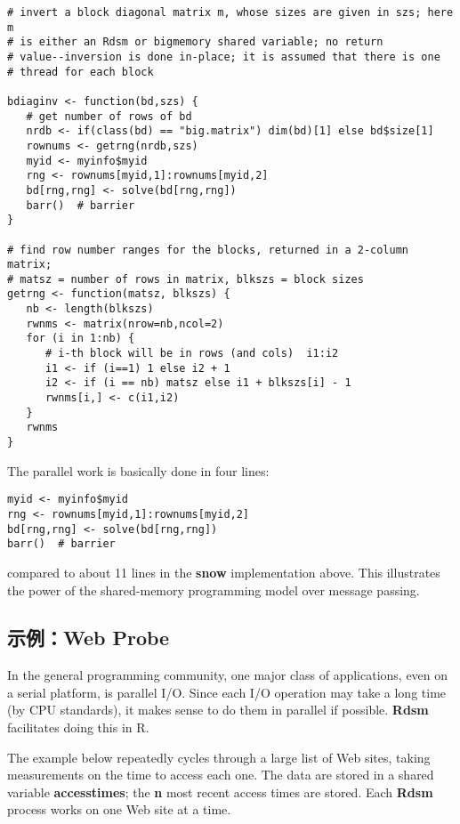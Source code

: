 \begin{lstlisting}
# invert a block diagonal matrix m, whose sizes are given in szs; here m
# is either an Rdsm or bigmemory shared variable; no return
# value--inversion is done in-place; it is assumed that there is one
# thread for each block

bdiaginv <- function(bd,szs) {
   # get number of rows of bd
   nrdb <- if(class(bd) == "big.matrix") dim(bd)[1] else bd$size[1]
   rownums <- getrng(nrdb,szs)
   myid <- myinfo$myid
   rng <- rownums[myid,1]:rownums[myid,2]
   bd[rng,rng] <- solve(bd[rng,rng])
   barr()  # barrier
}

# find row number ranges for the blocks, returned in a 2-column matrix;
# matsz = number of rows in matrix, blkszs = block sizes
getrng <- function(matsz, blkszs) {
   nb <- length(blkszs)
   rwnms <- matrix(nrow=nb,ncol=2)
   for (i in 1:nb) {
      # i-th block will be in rows (and cols)  i1:i2
      i1 <- if (i==1) 1 else i2 + 1
      i2 <- if (i == nb) matsz else i1 + blkszs[i] - 1
      rwnms[i,] <- c(i1,i2)
   }
   rwnms
}
\end{lstlisting}

The parallel work is basically done in four lines:

\begin{lstlisting}
myid <- myinfo$myid
rng <- rownums[myid,1]:rownums[myid,2]
bd[rng,rng] <- solve(bd[rng,rng])
barr()  # barrier
\end{lstlisting}

compared to about 11 lines in the {\bf snow} implementation above.  This
illustrates the power of the shared-memory programming model over
message passing.

\subsection{示例：Web Probe}

In the general programming community, one major class of applications,
even on a serial platform, is parallel I/O.  Since each I/O operation
may take a long time (by CPU standards), it makes sense to do them in
parallel if possible.  {\bf Rdsm} facilitates doing this in R.

The example below repeatedly cycles through a large list of Web sites,
taking measurements on the time to access each one.  The data are stored
in a shared variable {\bf accesstimes}; the {\bf n} most recent access
times are stored.  Each {\bf Rdsm} process works on one Web site at a
time.

